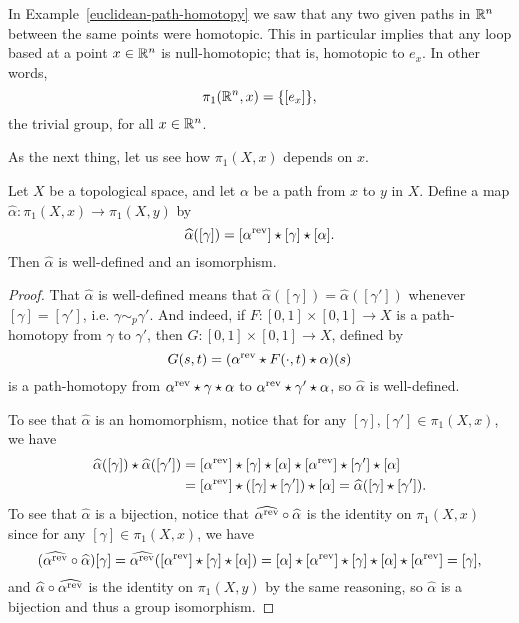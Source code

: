 \begin{example}
  \label{fundemental-group-euclidean}
  In Example~\ref{euclidean-path-homotopy} we saw that any two given paths in $\mathbb{R}^n$ between the same points were homotopic. This in particular implies that any loop based at a point $x \in \mathbb{R}^n$ is null-homotopic; that is, homotopic to $e_x$. In other words,
  \[
    \pi_1(\mathbb{R}^n, x) = \{[e_x]\},
  \]
  the trivial group, for all $x \in \mathbb{R}^n$.
\end{example}
As the next thing, let us see how $\pi_1(X,x)$ depends on $x$.
\begin{thm}
  Let $X$ be a topological space, and let $\alpha$ be a path from $x$ to $y$ in $X$. Define a map $\hat{\alpha} : \pi_1(X,x) \to \pi_1(X,y)$ by
  \[
    \widehat{\alpha}([\gamma]) = [\alpha^{\mathrm{rev}}] \star [\gamma] \star [\alpha].
  \]
  Then $\hat{\alpha}$ is well-defined and an isomorphism.
\end{thm}
\begin{proof}
  That $\hat{\alpha}$ is well-defined means that $\hat{\alpha}([\gamma]) = \hat{\alpha}([\gamma'])$ whenever $[\gamma] = [\gamma']$, i.e. $\gamma \sim_p \gamma'$. And indeed, if $F: [0,1] \times [0,1] \to X$ is a path-homotopy from $\gamma$ to $\gamma'$, then $G : [0,1] \times [0,1] \to X$, defined by
  \[
    G(s,t) = (\alpha^{\mathrm{rev}} \star F(\cdot,t) \star \alpha)(s)
  \]
  is a path-homotopy from $\alpha^{\mathrm{rev}} \star \gamma \star \alpha$ to $\alpha^{\mathrm{rev}} \star \gamma' \star \alpha$, so $\hat{\alpha}$ is well-defined.

  To see that $\hat{\alpha}$ is an homomorphism, notice that for any $[\gamma], [\gamma'] \in \pi_1(X,x)$, we have
  \begin{align*}
    \widehat{\alpha}([\gamma]) \star \widehat{\alpha}([\gamma']) &= [\alpha^{\mathrm{rev}}] \star [\gamma] \star [\alpha] \star [\alpha^{\mathrm{rev}}] \star [\gamma'] \star [\alpha] \\
      &= [\alpha^{\mathrm{rev}}] \star ([\gamma] \star [\gamma']) \star [\alpha] = \widehat{\alpha}([\gamma] \star [\gamma']).
  \end{align*}
  To see that $\hat{\alpha}$ is a bijection, notice that $\widehat{\alpha^{\mathrm{rev}}} \circ \widehat{\alpha}$ is the identity on $\pi_1(X,x)$ since for any $[\gamma] \in \pi_1(X,x)$, we have
  \[
    (\widehat{\alpha^{\mathrm{rev}}} \circ \widehat{\alpha})[\gamma] = \widehat{\alpha^{\mathrm{rev}}}([\alpha^{\mathrm{rev}}] \star [\gamma] \star [\alpha]) = [\alpha] \star [\alpha^{\mathrm{rev}}] \star [\gamma] \star [\alpha] \star [\alpha^{\mathrm{rev}}] = [\gamma],
  \]
  and $\widehat{\alpha} \circ \widehat{\alpha^{\mathrm{rev}}}$ is the identity on $\pi_1(X,y)$ by the same reasoning, so $\hat{\alpha}$ is a bijection and thus a group isomorphism.
\end{proof}
